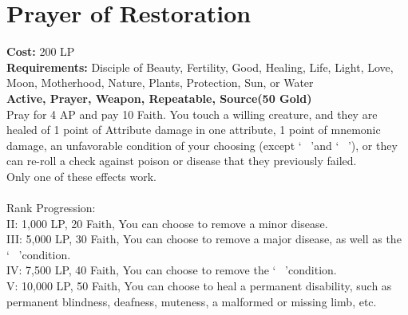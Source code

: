 \section{Prayer of Restoration}\label{prayer:restoration}
\textbf{Cost:} 200 LP\\
\textbf{Requirements:} Disciple of Beauty, Fertility, Good, Healing, Life, Light, Love, Moon, Motherhood, Nature, Plants, Protection, Sun, or Water \\
\textbf{Active, Prayer, Weapon, Repeatable, Source(50 Gold)}\\
Pray for 4 AP and pay 10 Faith.
You touch a willing creature, and they are healed of 1 point of Attribute damage in one attribute, 1 point of mnemonic damage, an unfavorable condition of your choosing (except \lq ~ \rq and \lq ~ \rq), or they can re-roll a check against poison or disease that they previously failed.\\
Only one of these effects work.\\
\\
Rank Progression:\\
II: 1,000 LP, 20 Faith, You can choose to remove a minor disease.\\
III: 5,000 LP, 30 Faith, You can choose to remove a major disease, as well as the \lq ~ \rq condition.\\
IV: 7,500 LP, 40 Faith, You can choose to remove the \lq ~ \rq condition.\\
V: 10,000 LP, 50 Faith, You can choose to heal a permanent disability, such as permanent blindness, deafness, muteness, a malformed or missing limb, etc.\\